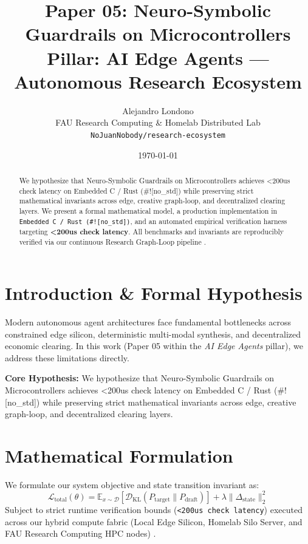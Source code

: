 \documentclass[10pt,twocolumn]{article}
\title{\textbf{Paper 05: Neuro-Symbolic Guardrails on Microcontrollers}\\
\large Pillar: AI Edge Agents --- Autonomous Research Ecosystem}
\author{
  Alejandro Londono \\
  FAU Research Computing \& Homelab Distributed Lab \\
  \texttt{NoJuanNobody/research-ecosystem}
}
\date{\today}
\begin{document}
\maketitle

\begin{abstract}
We hypothesize that Neuro-Symbolic Guardrails on Microcontrollers achieves <200us check latency on Embedded C / Rust (\#![no\_std]) while preserving strict mathematical invariants across edge, creative graph-loop, and decentralized clearing layers.
We present a formal mathematical model, a production implementation in \texttt{Embedded C / Rust (\#![no\_std])}, and an automated empirical verification harness targeting \textbf{<200us check latency}. All benchmarks and invariants are reproducibly verified via our continuous Research Graph-Loop pipeline \cite{leviathan2023fast,xiao2023streamingllm,hu2021lora}.
\end{abstract}

\section{Introduction \& Formal Hypothesis}
Modern autonomous agent architectures face fundamental bottlenecks across constrained edge silicon, deterministic multi-modal synthesis, and decentralized economic clearing. In this work (Paper 05 within the \textit{AI Edge Agents} pillar), we address these limitations directly.

\textbf{Core Hypothesis:} We hypothesize that Neuro-Symbolic Guardrails on Microcontrollers achieves <200us check latency on Embedded C / Rust (\#![no\_std]) while preserving strict mathematical invariants across edge, creative graph-loop, and decentralized clearing layers.

\section{Mathematical Formulation}
We formulate our system objective and state transition invariant as:
\begin{equation}
\mathcal{L}_{\text{total}}(\theta) = \mathbb{E}_{x \sim \mathcal{D}}\left[\mathcal{D}_{\text{KL}}(P_{\text{target}} \parallel P_{\text{draft}})\right] + \lambda \|\Delta_{\text{state}}\|_2^2
\end{equation}
Subject to strict runtime verification bounds (\texttt{<200us check latency}) executed across our hybrid compute fabric (Local Edge Silicon, Homelab Silo Server, and FAU Research Computing HPC nodes) \cite{rafailov2023dpo,shapley1953value,hanson2003combinatorial}.
\end{document}
